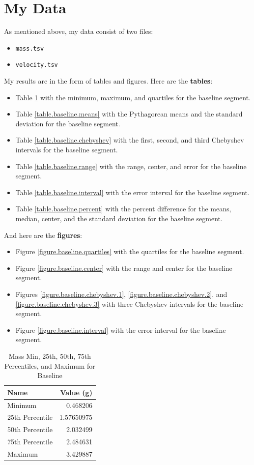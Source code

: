 \section{My Data}
As mentioned above, my data consist of two files:
\begin{itemize}
    \item \texttt{mass.tsv}
    \item \texttt{velocity.tsv}
\end{itemize}
My results are in the form of tables and figures. Here are the \textbf{tables}:
\begin{itemize}
    \item Table \ref{table.baseline.descriptive} with the minimum, maximum, and quartiles for the baseline segment.
    \item Table \ref{table.baseline.means} with the Pythagorean means and the standard deviation for the baseline segment.
    \item Table \ref{table.baseline.chebyshev} with the first, second, and third Chebyshev intervals for the baseline segment.
    \item Table \ref{table.baseline.range} with the range, center, and error for the baseline segment.
    \item Table \ref{table.baseline.interval} with the error interval for the baseline segment.
    \item Table \ref{table.baseline.percent} with the percent difference for the means, median, center, and the standard deviation for the baseline segment.
\end{itemize}
And here are the \textbf{figures}:
\begin{itemize}
    \item Figure \ref{figure.baseline.quartiles} with the quartiles for the baseline segment.
    \item Figure \ref{figure.baseline.center} with the range and center for the baseline segment.
    \item Figures \ref{figure.baseline.chebyshev.1}, \ref{figure.baseline.chebyshev.2}, and \ref{figure.baseline.chebyshev.3} with three Chebyshev intervals for the baseline segment.
    \item Figure \ref{figure.baseline.interval} with the error interval for the baseline segment.
\end{itemize}
\begin{table} \label{table.baseline.descriptive}
    \centering
	\begin{tabular}{|l|r|} \hline
        \textbf{Name} & \textbf{Value (g)} \\
        \hline
		Minimum & 0.468206 \\
		25th Percentile & 1.57650975 \\
		50th Percentile & 2.032499 \\
		75th Percentile & 2.484631 \\
		Maximum & 3.429887 \\
		\hline
	\end{tabular}
	\caption{Mass Min, 25th, 50th, 75th Percentiles, and Maximum for Baseline}
\end{table}
